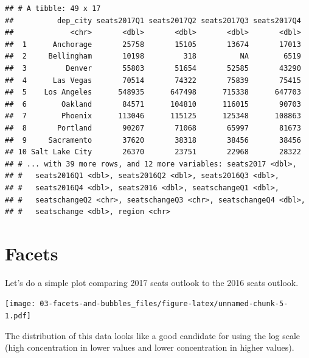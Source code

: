 \documentclass[]{book}
\newenvironment{Shaded}{\begin{snugshade}}{\end{snugshade}}
\newcommand{\KeywordTok}[1]{\textcolor[rgb]{0.13,0.29,0.53}{\textbf{{#1}}}}
\newcommand{\DataTypeTok}[1]{\textcolor[rgb]{0.13,0.29,0.53}{{#1}}}
\newcommand{\DecValTok}[1]{\textcolor[rgb]{0.00,0.00,0.81}{{#1}}}
\newcommand{\StringTok}[1]{\textcolor[rgb]{0.31,0.60,0.02}{{#1}}}
\newcommand{\CommentTok}[1]{\textcolor[rgb]{0.56,0.35,0.01}{\textit{{#1}}}}
\newcommand{\NormalTok}[1]{{#1}}
\theoremstyle{definition}
\theoremstyle{definition}
\theoremstyle{remark}
\begin{document}
\begin{verbatim}
## # A tibble: 49 x 17
##          dep_city seats2017Q1 seats2017Q2 seats2017Q3 seats2017Q4
##             <chr>       <dbl>       <dbl>       <dbl>       <dbl>
##  1      Anchorage       25758       15105       13674       17013
##  2     Bellingham       10198         318          NA        6519
##  3         Denver       55803       51654       52585       43290
##  4      Las Vegas       70514       74322       75839       75415
##  5    Los Angeles      548935      647498      715338      647703
##  6        Oakland       84571      104810      116015       90703
##  7        Phoenix      113046      115125      125348      108863
##  8       Portland       90207       71068       65997       81673
##  9     Sacramento       37620       38318       38456       38456
## 10 Salt Lake City       26370       23751       22968       28322
## # ... with 39 more rows, and 12 more variables: seats2017 <dbl>,
## #   seats2016Q1 <dbl>, seats2016Q2 <dbl>, seats2016Q3 <dbl>,
## #   seats2016Q4 <dbl>, seats2016 <dbl>, seatschangeQ1 <dbl>,
## #   seatschangeQ2 <chr>, seatschangeQ3 <chr>, seatschangeQ4 <dbl>,
## #   seatschange <dbl>, region <chr>
\end{verbatim}

\section{Facets}\label{facets}

Let's do a simple plot comparing 2017 seats outlook to the 2016 seats
outlook.

\begin{Shaded}
\end{Shaded}

\texttt{[image: 03-facets-and-bubbles\_files/figure-latex/unnamed-chunk-5-1.pdf]}

The distribution of this data looks like a good candidate for using the
log scale (high concentration in lower values and lower concentration in
higher values).

\begin{Shaded}
\end{Shaded}
\end{document}

